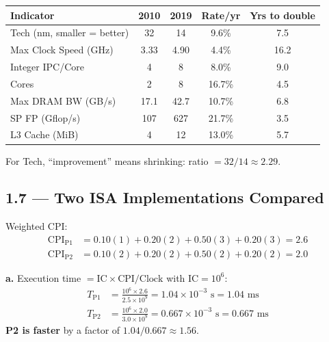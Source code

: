 \begin{center}
\small
\begin{tabular}{lcccc}
\toprule
\textbf{Indicator} & \textbf{2010} & \textbf{2019} & \textbf{Rate/yr} &
\textbf{Yrs to double} \\
\midrule
Tech (nm, smaller = better) & 32  & 14  & 9.6\%  & 7.5  \\
Max Clock Speed (GHz)       & 3.33 & 4.90 & 4.4\% & 16.2 \\
Integer IPC/Core            & 4   & 8   & 8.0\%  & 9.0  \\
Cores                       & 2   & 8   & 16.7\% & 4.5  \\
Max DRAM BW (GB/s)          & 17.1 & 42.7 & 10.7\% & 6.8 \\
SP FP (Gflop/s)             & 107  & 627  & 21.7\% & 3.5 \\
L3 Cache (MiB)              & 4   & 12  & 13.0\% & 5.7  \\
\bottomrule
\end{tabular}
\end{center}

For Tech, ``improvement'' means shrinking: ratio $= 32/14 \approx 2.29$.

\subsection*{1.7 --- Two ISA Implementations Compared}
\hypertarget{sol-1.7}{}

Weighted CPI:
\begin{align*}
  \text{CPI}_{\text{P1}} &= 0.10(1) + 0.20(2) + 0.50(3) + 0.20(3) = 2.6 \\
  \text{CPI}_{\text{P2}} &= 0.10(2) + 0.20(2) + 0.50(2) + 0.20(2) = 2.0
\end{align*}

\noindent\textbf{a.} Execution time $= \text{IC} \times \text{CPI} /
\text{Clock}$ with $\text{IC} = 10^6$:
\begin{align*}
  T_{\text{P1}} &= \frac{10^6 \times 2.6}{2.5 \times 10^9}
                 = 1.04 \times 10^{-3}\text{ s} = 1.04\text{ ms} \\
  T_{\text{P2}} &= \frac{10^6 \times 2.0}{3.0 \times 10^9}
                 = 0.667 \times 10^{-3}\text{ s} = 0.667\text{ ms}
\end{align*}
\textbf{P2 is faster} by a factor of $1.04/0.667 \approx 1.56$.

